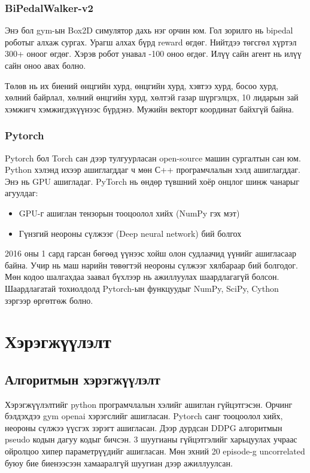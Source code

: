 \documentclass[12pt,A4]{report}
\begin{document}
\subsection{BiPedalWalker-v2}

Энэ бол gym-ын Box2D симулятор дахь нэг орчин юм. Гол зорилго нь bipedal роботыг алхаж сургах. Урагш алхах бүрд reward өгдөг. Нийтдээ төгсгөл хүртэл 300+ оноог өгдөг. Хэрэв робот унавал -100 оноо өгдөг. Илүү сайн агент нь илүү сайн оноо авах болно. 

Төлөв нь их биений өнцгийн хурд, өнцгийн хурд, хэвтээ хурд, босоо хурд, хөлний байрлал, хөлний өнцгийн хурд, хөлтэй газар шүргэлцэх, 10 лидарын зай хэмжигч хэмжигдэхүүнээс бүрдэнэ. Мужийн векторт координат байхгүй байна.

\subsection{Pytorch}

Pytorch бол Torch сан дээр тулгуурласан open-source машин сургалтын сан юм. Python хэлэнд ихээр ашиглагддаг ч мөн С++ програмчлалын хэлд ашиглагддаг. Энэ нь GPU ашигладаг. PyTorch нь өндөр түвшний хоёр онцлог шинж чанарыг агуулдаг:

\begin{itemize}
	\item GPU-г ашиглан тензорын тооцоолол хийх (NumPy гэх мэт) 
	\item Гүнзгий неороны сүлжээг (Deep neural network) бий болгох
\end{itemize}

2016 оны 1 сард гарсан бөгөөд үүнээс хойш олон судлаачид үүнийг ашигласаар байна. Учир нь маш нарийн төвөгтэй неороны сүлжээг хялбараар бий болгодог. Мөн кодоо шалгахдаа заавал бүхлээр нь ажиллуулах шаардлагагүй болсон. Шаардлагатай тохиолдолд Pytorch-ын функцуудыг NumPy, SciPy, Cython зэргээр өргөтгөж болно. 
 
\chapter{Хэрэгжүүлэлт}

\section{Алгоритмын хэрэгжүүлэлт}

Хэрэгжүүлэлтийг python програмчлалын хэлийг ашиглан гүйцэтгэсэн. Орчинг бэлдэхдээ gym openai хэрэгслийг ашигласан. Pytorch санг тооцоолол хийх, неороны сүлжээ үүсгэх зэрэгт ашигласан. Дээр дурдсан DDPG алгоритмын pseudo кодын дагуу кодыг бичсэн. 3 шуугианы гүйцэтгэлийг харьцуулах учраас ойролцоо хипер параметрүүдийг ашигласан. Мөн эхний 20 episode-g uncorrelated буюу бие биенээсээн хамааралгүй шуугиан дээр ажиллуулсан.
\end{document}
